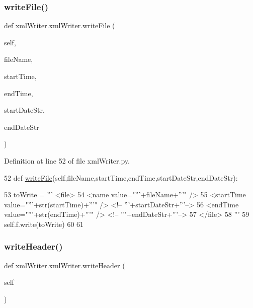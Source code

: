 \subsubsection{\texorpdfstring{write\+File()}{writeFile()}}
{\footnotesize\ttfamily def xml\+Writer.\+xml\+Writer.\+write\+File (\begin{DoxyParamCaption}\item[{}]{self,  }\item[{}]{file\+Name,  }\item[{}]{start\+Time,  }\item[{}]{end\+Time,  }\item[{}]{start\+Date\+Str,  }\item[{}]{end\+Date\+Str }\end{DoxyParamCaption})}



Definition at line 52 of file xml\+Writer.\+py.


\begin{DoxyCode}
52     \textcolor{keyword}{def }\mbox{\hyperlink{classxml_writer_1_1xml_writer_ab686ea3fea2fc1122eb2878aaa61e6b7}{writeFile}}(self,fileName,startTime,endTime,startDateStr,endDateStr):                       
       
53         toWrite = \textcolor{stringliteral}{'''       <file>}
54 \textcolor{stringliteral}{            <name value="'''}+fileName+\textcolor{stringliteral}{'''" />}
55 \textcolor{stringliteral}{            <startTime value="'''}+str(startTime)+\textcolor{stringliteral}{'''" />    <!-- '''}+startDateStr+\textcolor{stringliteral}{'''-->}
56 \textcolor{stringliteral}{            <endTime value="'''}+str(endTime)+\textcolor{stringliteral}{'''" />    <!-- '''}+endDateStr+\textcolor{stringliteral}{'''-->}
57 \textcolor{stringliteral}{        </file>}
58 \textcolor{stringliteral}{'''}
59         self.f.write(toWrite)
60         
61 \end{DoxyCode}
\mbox{\label{classxml_writer_1_1xml_writer_aa05ece2d045f4be023b005b42e892736}} 
\subsubsection{\texorpdfstring{write\+Header()}{writeHeader()}}
{\footnotesize\ttfamily def xml\+Writer.\+xml\+Writer.\+write\+Header (\begin{DoxyParamCaption}\item[{}]{self }\end{DoxyParamCaption})}



